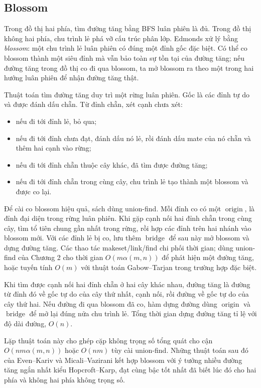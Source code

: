\documentclass[11pt]{article}
\begin{document}
\subsection*{Blossom}

Trong đồ thị hai phía, tìm đường tăng bằng BFS luân phiên là đủ. Trong đồ thị
không hai phía, chu trình lẻ phá vỡ cấu trúc phân lớp. Edmonds xử lý bằng
\emph{blossom}: một chu trình lẻ luân phiên có đúng một đỉnh gốc đặc biệt. Có
thể co blossom thành một siêu đỉnh mà vẫn bảo toàn sự tồn tại của đường tăng;
nếu đường tăng trong đồ thị co đi qua blossom, ta mở blossom ra theo một trong
hai hướng luân phiên để nhận đường tăng thật.

Thuật toán tìm đường tăng duy trì một rừng luân phiên. Gốc là các đỉnh tự do và
được đánh dấu chẵn. Từ đỉnh chẵn, xét cạnh chưa xét:
\begin{itemize}
  \item nếu đi tới đỉnh lẻ, bỏ qua;
  \item nếu đi tới đỉnh chưa đạt, đánh dấu nó lẻ, rồi đánh dấu mate của nó chẵn
        và thêm hai cạnh vào rừng;
  \item nếu đi tới đỉnh chẵn thuộc cây khác, đã tìm được đường tăng;
  \item nếu đi tới đỉnh chẵn trong cùng cây, chu trình lẻ tạo thành một blossom
        và được co lại.
\end{itemize}

Để cài co blossom hiệu quả, sách dùng union-find. Mỗi đỉnh co có một
\(\operatorname{origin}\), là đỉnh đại diện trong rừng luân phiên. Khi gặp cạnh
nối hai đỉnh chẵn trong cùng cây, tìm tổ tiên chung gần nhất trong rừng, rồi hợp
các đỉnh trên hai nhánh vào blossom mới. Với các đỉnh lẻ bị co, lưu thêm
\(\operatorname{bridge}\) để sau này mở blossom và dựng đường tăng. Các thao tác
makeset/link/find chi phối thời gian; dùng union-find của Chương 2 cho thời gian
\(O(m\alpha(m,n))\) để phát hiện một đường tăng, hoặc tuyến tính \(O(m)\) với
thuật toán Gabow--Tarjan trong trường hợp đặc biệt.

Khi tìm được cạnh nối hai đỉnh chẵn ở hai cây khác nhau, đường tăng là đường
từ đỉnh đó về gốc tự do của cây thứ nhất, cạnh nối, rồi đường về gốc tự do của
cây thứ hai. Nếu đường đi qua blossom đã co, hàm dựng đường dùng
\(\operatorname{origin}\) và \(\operatorname{bridge}\) để mở lại đúng nửa chu
trình lẻ. Tổng thời gian dựng đường tăng tỉ lệ với độ dài đường, \(O(n)\).

Lặp thuật toán này cho ghép cặp không trọng số tổng quát cho cận
\(O(nm\alpha(m,n))\) hoặc \(O(nm)\) tùy cài union-find. Những thuật toán sau đó
của Even--Kariv và Micali--Vazirani kết hợp blossom với ý tưởng nhiều đường
tăng ngắn nhất kiểu Hopcroft--Karp, đạt cùng bậc tốt nhất đã biết lúc đó cho
hai phía và không hai phía không trọng số.
\end{document}
